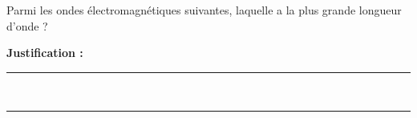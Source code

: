 Parmi les ondes électromagnétiques suivantes, laquelle a la plus grande longueur d'onde ?

\choices

\noindent\textbf{Justification :} \hrulefill \\[2.5ex]
\rule{\linewidth}{0.4pt} \\[2.5ex]
\rule{\linewidth}{0.4pt}
\vfill
